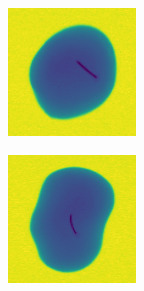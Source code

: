 \documentclass[11pt]{article}
\begin{document}
\begin{figure}[!h]
\begin{subfigure}[b]{0.22\textwidth}
         \caption{}
         \label{fig:metal_45}
     \end{subfigure}
     \hfill
     \begin{subfigure}[b]{0.22\textwidth}
         \centering
         \includegraphics[width=\textwidth]{figurer/potato_dataset/metal/metal_46.jpg}
         \caption{}
         \label{fig:metal_46}
     \end{subfigure}
     \hfill
     \begin{subfigure}[b]{0.22\textwidth}
         \centering
         \includegraphics[width=\textwidth]{figurer/potato_dataset/metal/metal_47.jpg}

\end{subfigure}
\end{figure}
\end{document}
